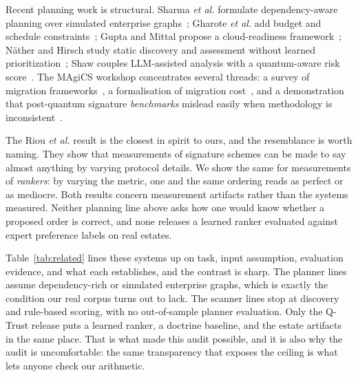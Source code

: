 \documentclass[journal,10pt]{IEEEtran}
\begin{document}
Recent planning work is structural. Sharma \emph{et al.} formulate dependency-aware planning over
simulated enterprise graphs~\cite{sharma2026}; Gharote \emph{et al.} add budget and schedule
constraints~\cite{gharote2026}; Gupta and Mittal propose a cloud-readiness framework~\cite{gupta2026};
N\"ather and Hirsch study static discovery and assessment without learned
prioritization~\cite{nother2026}; Shaw couples LLM-assisted analysis with a quantum-aware risk
score~\cite{shaw2026}. The MAgiCS workshop concentrates several threads: a survey of migration
frameworks~\cite{nzetchuen2026}, a formalisation of migration cost~\cite{loebenberger2026}, and a
demonstration that post-quantum signature \emph{benchmarks} mislead easily when methodology is
inconsistent~\cite{riou2026}.

The Riou \emph{et al.} result is the closest in spirit to ours, and the resemblance is worth
naming. They show that measurements of signature schemes can be made to say almost anything by
varying protocol details. We show the same for measurements of \emph{rankers}: by varying the
metric, one and the same ordering reads as perfect or as mediocre. Both results concern measurement
artifacts rather than the systems measured. Neither planning line above asks how one would know
whether a proposed order is correct, and none releases a learned ranker evaluated against expert
preference labels on real estates.

Table~\ref{tab:related} lines these systems up on task, input assumption, evaluation evidence, and
what each establishes, and the contrast is sharp. The planner lines assume dependency-rich or
simulated enterprise graphs, which is exactly the condition our real corpus turns out to lack. The
scanner lines stop at discovery and rule-based scoring, with no out-of-sample planner evaluation.
Only the Q-Trust release puts a learned ranker, a doctrine baseline, and the estate artifacts in
the same place. That is what made this audit possible, and it is also why the audit is
uncomfortable: the same transparency that exposes the ceiling is what lets anyone check our
arithmetic.
\end{document}
